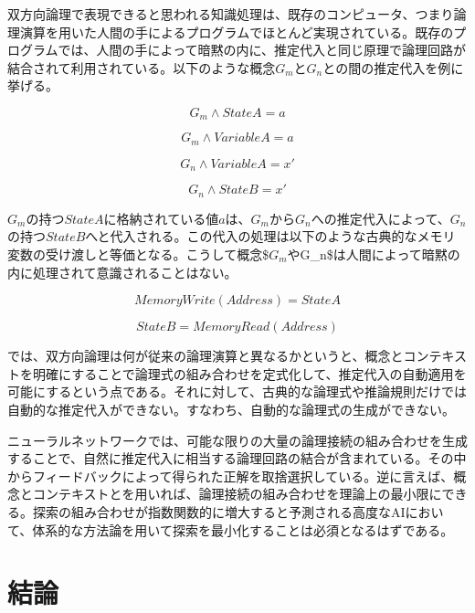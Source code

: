\documentclass[12pt]{article}
\begin{document}
双方向論理で表現できると思われる知識処理は、既存のコンピュータ、つまり論理演算を用いた人間の手によるプログラムでほとんど実現されている。既存のプログラムでは、人間の手によって暗黙の内に、推定代入と同じ原理で論理回路が結合されて利用されている。以下のような概念\(G_m\)と\(G_n\)との間の推定代入を例に挙げる。

\begin{equation} G_{m} \wedge StateA = a \end{equation}

\begin{equation} G_{m} \wedge VariableA = a \end{equation}

\begin{equation} G_{n} \wedge VariableA = x' \end{equation}

\begin{equation} G_{n} \wedge StateB = x'\end{equation}

\(G_{m}\)の持つ\(StateA\)に格納されている値\(a\)は、\(G_{m}\)から\(G_{n}\)への推定代入によって、\(G_{n}\)の持つ\(StateB\)へと代入される。この代入の処理は以下のような古典的なメモリ変数の受け渡しと等価となる。こうして概念\$\(G_m\)やG\_n\$は人間によって暗黙の内に処理されて意識されることはない。

\begin{equation} MemoryWrite(Address)=StateA  \end{equation}

\begin{equation} StateB=MemoryRead (Address)  \end{equation}

では、双方向論理は何が従来の論理演算と異なるかというと、概念とコンテキストを明確にすることで論理式の組み合わせを定式化して、推定代入の自動適用を可能にするという点である。それに対して、古典的な論理式や推論規則だけでは自動的な推定代入ができない。すなわち、自動的な論理式の生成ができない。

ニューラルネットワークでは、可能な限りの大量の論理接続の組み合わせを生成することで、自然に推定代入に相当する論理回路の結合が含まれている。その中からフィードバックによって得られた正解を取捨選択している。逆に言えば、概念とコンテキストとを用いれば、論理接続の組み合わせを理論上の最小限にできる。探索の組み合わせが指数関数的に増大すると予測される高度なAIにおいて、体系的な方法論を用いて探索を最小化することは必須となるはずである。

\clearpage
\section{結論}\label{ux7d50ux8ad6}
\end{document}
